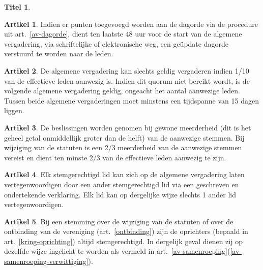 \documentclass[a4paper,10pt]{article}
\theoremstyle{definition}
\newtheorem{titel}{\newline\Large Titel}
\newtheorem{artikelbase}{\large Artikel}
\newenvironment{artikel}
  {\begin{artikelbase}}
  {\smallskip
   \end{artikelbase}}
\newcommand{\ttextcr}{\hfill\newline}
\begin{document}
\begin{titel}
  \begin{artikel}\ttextcr
    Indien er punten toegevoegd worden aan de dagorde via de procedure uit art.~\ref{av-dagorde}, dient ten laatste 48 uur voor de start van de algemene vergadering, via schriftelijke of elektronische weg, een ge\"update dagorde verstuurd te worden naar de leden.
  \end{artikel}

  \begin{artikel}\ttextcr
    De algemene vergadering kan slechts geldig vergaderen indien 1/10 van de effectieve leden aanwezig is.
    Indien dit quorum niet bereikt wordt, is de volgende algemene vergadering geldig, ongeacht het aantal aanwezige leden.
    Tussen beide algemene vergaderingen moet minstens een tijdspanne van 15 dagen liggen.
  \end{artikel}

  \begin{artikel}\label{av-beslissen}\ttextcr
    De beslissingen worden genomen bij gewone meerderheid (dit is het geheel getal onmiddellijk groter dan de helft) van de aanwezige stemmen.
    Bij wijziging van de statuten is een 2/3 meerderheid van de aanwezige stemmen vereist en dient ten minste 2/3 van de effectieve leden aanwezig te zijn.
  \end{artikel}

  \begin{artikel}\ttextcr
    Elk stemgerechtigd lid kan zich op de algemene vergadering laten vertegenwoordigen door een ander stemgerechtigd lid via een geschreven en ondertekende verklaring.
    Elk lid kan op dergelijke wijze slechts 1 ander lid vertegenwoordigen.
  \end{artikel}

  \begin{artikel}\ttextcr
    Bij een stemming over de wijziging van de statuten of over de ontbinding van de vereniging (art.~\ref{ontbinding}) zijn de oprichters (bepaald in art.~\ref{kring-oprichting}) altijd stemgerechtigd.
    In dergelijk geval dienen zij op dezelfde wijze ingelicht te worden als vermeld in art.~\ref{av-samenroeping}(\ref{av-samenroeping-verwittiging}).
  \end{artikel}


\end{titel}
\end{document}
